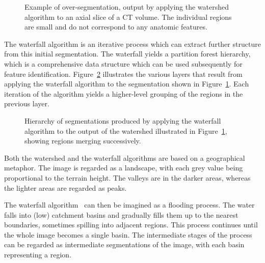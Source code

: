 \documentclass{ouclprgsc}
\begin{document}
\begin{figure}
\centering
\ifpdf
        \hspace{1mm}%
\else
\fi
\caption{Example of over-segmentation, output by applying the watershed
  algorithm to an axial slice of a CT volume. The individual regions
  are small and do not correspond to any anatomic features.}
\label{fig:oversegmented}
\end{figure}
\vspace{-5mm}
The waterfall algorithm is an iterative process which can extract
further structure from this initial segmentation. The waterfall yields
a partition forest hierarchy, which is a comprehensive data structure
which can be used subsequently for feature identification.
Figure~\ref{fig:waterfall} illustrates the various layers that result
from applying the waterfall algorithm to the segmentation shown in
Figure~\ref{fig:oversegmented}.  Each iteration of the algorithm
yields a higher-level grouping of the regions in the previous layer.
\vspace{-5mm}
\begin{figure}
\centering
\ifpdf
        \hspace{1mm}%
        \hspace{1mm}%
\else
\fi
\caption{Hierarchy of segmentations produced by applying the waterfall
  algorithm to the output of the watershed illustrated in
  Figure~\ref{fig:oversegmented}, showing regions merging
  successively.}
\label{fig:waterfall}
\end{figure}

Both the watershed and the waterfall algorithms are based on a
geographical metaphor. The image is regarded as a landscape, with each
grey value being proportional to the terrain height.
%
The valleys are
in the darker areas, whereas the lighter areas are regarded as peaks.

The waterfall algorithm~\cite{beucher94,marcotegui} can then be imagined
as a flooding process. The water falls into (low) catchment basins and
gradually fills them up to the nearest boundaries, sometimes spilling
into adjacent regions. This process continues until the whole image
becomes a single basin. The intermediate stages of the process can be
regarded as intermediate segmentations of the image, with each basin
representing a region.
\end{document}
